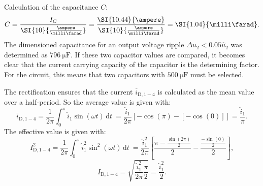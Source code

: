 \begin{solutionblock}
    Calculation of the capacitance $C$:
    \begin{equation}
        C = \frac{I_\mathrm{C}}{\SI{10}{\frac{\ampere}{\milli\farad}}} = \frac{\SI{10.44}{\ampere}}{\SI{10}{\frac{\ampere}{\milli\farad}}}=\SI{1.04}{\milli\farad}.
    \end{equation}
    The dimensioned capacitance for an output voltage ripple $\Delta u_{\mathrm{2}}<0.05  \hat u_{\mathrm{2}}$ was determined as $\SI{796}{\micro\farad}$.
    If these two capacitor values are compared, it becomes clear that the current carrying capacity of the capacitor is the determining factor. For the circuit, this means that two capacitors with $\SI{500}{\micro\farad}$ must be selected.
\end{solutionblock}
\begin{solutionblock}
    The rectification ensures that the current $\overline i_\mathrm{D,1-4}$ is calculated as the mean value over a half-period. So the average value is given with:
    \begin{equation}
        \overline{i}_{\mathrm{D,1-4}} = \frac{1}{2\pi} \int_{0}^{\pi} \hat{i}_{\mathrm{1}} \sin(\omega t) \, \mathrm{d}t\ = \frac{\hat{i}_{\mathrm{1}}}{2\pi} [-\cos(\pi)-[-\cos(0)]] = \frac{\hat{i}_{\mathrm{1}}}{\pi}.
    \end{equation}
    The effective value is given with:
    \begin{equation}
        I^2_{\mathrm{D,1-4}} = \frac{1}{2\pi} \int_{0}^{\pi} \hat{i}^2_{\mathrm{1}} \sin^2(\omega t) \, \mathrm{d}t\ = \frac{\hat{i}^2_{\mathrm{1}}}{2\pi}\left[\frac{\pi-\frac{\sin(2\pi)}{2}}{2}-\frac{\frac{-\sin(0)}{2}}{2}\right], 
    \end{equation}
    \begin{equation}
        I_{\mathrm{D,1-4}} = \sqrt{\frac{\hat{i}^2_{\mathrm{1}}}{2\pi}\frac{\pi}{2}} = \frac{\hat{i}^2_{\mathrm{1}}}{2}.
    \end{equation}
\end{solutionblock}